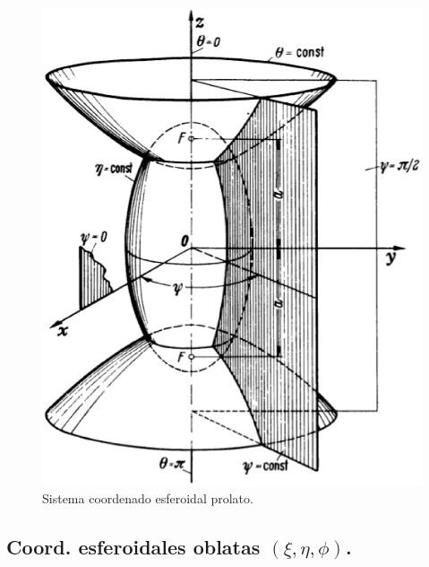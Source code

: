 \begin{figure}[H]
  \centering
  \includegraphics[scale=0.5]{Imagenes/Sistema_Esfeoridal_Prolato.eps}
  \caption{Sistema coordenado esferoidal prolato.}
\end{figure}

\subsection{Coord. esferoidales oblatas \texorpdfstring{$(\xi, \eta, \phi)$}{(x,e, f)}.}

